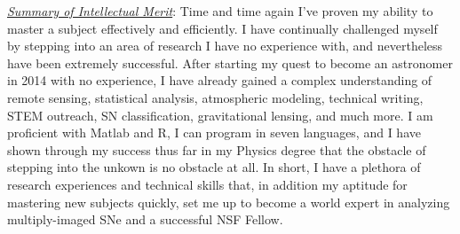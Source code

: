 \underline{\textit{Summary of Intellectual Merit}}:
Time and time again I've proven my ability to master a subject
effectively and efficiently. I have continually challenged myself by
stepping into an area of research I have no experience with, and
nevertheless have been extremely successful. After starting my quest
to become an astronomer in 2014 with no experience, I have already
gained a complex understanding of remote sensing, statistical
analysis, atmospheric modeling, technical writing, STEM outreach, SN
classification, gravitational lensing, and much more. I am proficient
with Matlab and R, I can program in seven languages, and I have shown
through my success thus far in my Physics degree that the obstacle of
stepping into the unkown is no obstacle at all. In short, I have a
plethora of research experiences and technical skills that, in
addition my aptitude for mastering new subjects quickly, set me up to
become a world expert in analyzing multiply-imaged SNe and a
successful NSF Fellow.



